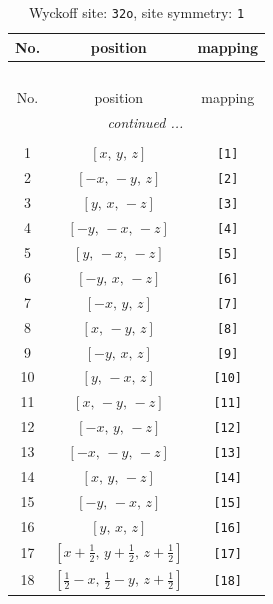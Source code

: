 \documentclass[fleqn,8pt]{jsarticle}
\begin{document}
\renewcommand{\arraystretch}{1.2}
\begin{longtable}{ccc}
\caption{Wyckoff site: {\tt 32o}, site symmetry: {\tt 1}}
 \\
 \hline \hline
No. & position & mapping \\ \hline \endfirsthead

\multicolumn{2}{l}{\tablename\ \thetable{}} \\
 \hline \hline
No. & position & mapping \\ \hline \endhead

 \hline \hline
\multicolumn{2}{r}{\footnotesize\it continued ...} \\ \endfoot

 \hline \hline
\multicolumn{2}{r}{} \\ \endlastfoot

1 & $\left[ x,\, y,\, z \right]$ & {\tt [1]} \\ \hline
2 & $\left[ - x,\, - y,\, z \right]$ & {\tt [2]} \\ \hline
3 & $\left[ y,\, x,\, - z \right]$ & {\tt [3]} \\ \hline
4 & $\left[ - y,\, - x,\, - z \right]$ & {\tt [4]} \\ \hline
5 & $\left[ y,\, - x,\, - z \right]$ & {\tt [5]} \\ \hline
6 & $\left[ - y,\, x,\, - z \right]$ & {\tt [6]} \\ \hline
7 & $\left[ - x,\, y,\, z \right]$ & {\tt [7]} \\ \hline
8 & $\left[ x,\, - y,\, z \right]$ & {\tt [8]} \\ \hline
9 & $\left[ - y,\, x,\, z \right]$ & {\tt [9]} \\ \hline
10 & $\left[ y,\, - x,\, z \right]$ & {\tt [10]} \\ \hline
11 & $\left[ x,\, - y,\, - z \right]$ & {\tt [11]} \\ \hline
12 & $\left[ - x,\, y,\, - z \right]$ & {\tt [12]} \\ \hline
13 & $\left[ - x,\, - y,\, - z \right]$ & {\tt [13]} \\ \hline
14 & $\left[ x,\, y,\, - z \right]$ & {\tt [14]} \\ \hline
15 & $\left[ - y,\, - x,\, z \right]$ & {\tt [15]} \\ \hline
16 & $\left[ y,\, x,\, z \right]$ & {\tt [16]} \\ \hline
17 & $\left[ x + \frac{1}{2},\, y + \frac{1}{2},\, z + \frac{1}{2} \right]$ & {\tt [17]} \\ \hline
18 & $\left[ \frac{1}{2} - x,\, \frac{1}{2} - y,\, z + \frac{1}{2} \right]$ & {\tt [18]} \\ \hline

\end{longtable}
\end{document}
